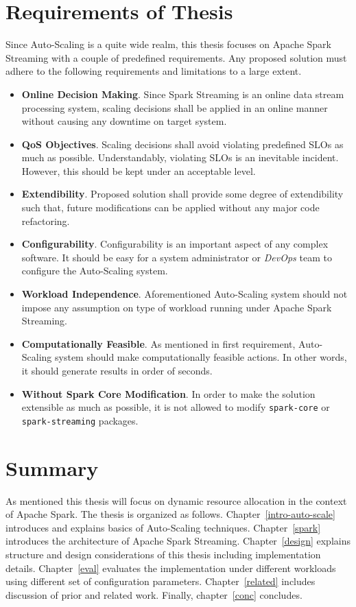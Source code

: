 \section{Requirements of Thesis}
Since Auto-Scaling is a quite wide realm, this thesis focuses on Apache Spark Streaming with a couple of predefined requirements. Any proposed solution must adhere to the following requirements and limitations to a large extent.
\begin{itemize}
    \item \textbf{Online Decision Making}. Since Spark Streaming is an online data stream processing system, scaling decisions shall be applied in an online manner without causing any downtime on target system.
    \item \textbf{QoS Objectives}. Scaling decisions shall avoid violating predefined SLOs as much as possible. Understandably, violating SLOs is an inevitable incident. However, this should be kept under an acceptable level.
    \item \textbf{Extendibility}. Proposed solution shall provide some degree of extendibility such that, future modifications can be applied without any major code refactoring.
    \item \textbf{Configurability}. Configurability is an important aspect of any complex software. It should be easy for a system administrator or \emph{DevOps} team to configure the Auto-Scaling system.
    \item \textbf{Workload Independence}. Aforementioned Auto-Scaling system should not impose any assumption on type of workload running under Apache Spark Streaming.
    \item \textbf{Computationally Feasible}. As mentioned in first requirement, Auto-Scaling system should make computationally feasible actions. In other words, it should generate results in order of seconds.
    \item \textbf{Without Spark Core Modification}. In order to make the solution extensible as much as possible, it is not allowed to modify \lstinline$spark-core$ or \lstinline$spark-streaming$ packages.
\end{itemize}

\section{Summary}
As mentioned this thesis will focus on dynamic resource allocation in the context of Apache Spark. The thesis is organized as follows. Chapter~\ref{intro-auto-scale} introduces and explains basics of Auto-Scaling techniques. Chapter~\ref{spark} introduces the architecture of Apache Spark Streaming. Chapter~\ref{design} explains structure and design considerations of this thesis including implementation details. Chapter~\ref{eval} evaluates the implementation under different workloads using different set of configuration parameters. Chapter~\ref{related} includes discussion of prior and related work. Finally, chapter~\ref{conc} concludes.